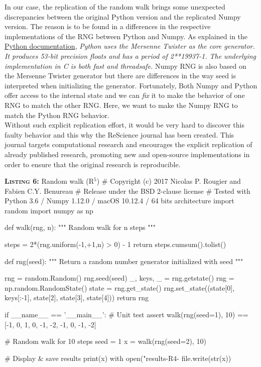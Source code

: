 \documentclass[a4paper,11pt]{article}
\begin{document}
In our case, the replication of the random walk brings some unexpected discrepancies between the original Python version and the replicated Numpy version.
The reason is to be found in a differences in the respective implementations of the RNG between Python and Numpy.
As explained in the \href{https://docs.python.org/3.6/library/random.html}{Python documentation}, {\em Python uses the Mersenne Twister as the core generator. It produces 53-bit precision floats
and has a period of 2**19937-1.
The underlying implementation in C is both fast and threadsafe.}
Numpy RNG is also based on the Mersenne Twister generator but there are differences in the way seed is interpreted when initializing the generator.
Fortunately, Both Numpy and Python offer access to the internal state and we can {\em fix} it to make the behavior of one RNG to match the other RNG.
Here, we want to make the Numpy RNG to match the Python RNG behavior.\\

Without such explicit replication effort, it would be very hard to discover this faulty behavior and this why the ReScience journal has been created.
This journal targets computational research and encourages the explicit replication of already published research, promoting new and open-source implementations in order to ensure that the original research is reproducible.

\begin{code}{\textbf{\textsc{Listing 6:}} Random walk (R$^5$)}
# Copyright (c) 2017 Nicolas P. Rougier and Fabien C.Y. Benureau
# Release under the BSD 2-clause license
# Tested with Python 3.6 / Numpy 1.12.0 / macOS 10.12.4 / 64 bits architecture
import random
import numpy as np

def walk(rng, n):
    """ Random walk for n steps """

    steps = 2*(rng.uniform(-1,+1,n) > 0) - 1
    return steps.cumsum().tolist()

def rng(seed):
    """ Return a random number generator initialized with seed """ 
    
    rng = random.Random()
    rng.seed(seed)
    _, keys, _ = rng.getstate()
    rng = np.random.RandomState()
    state = rng.get_state()
    rng.set_state((state[0], keys[:-1], state[2], state[3], state[4]))
    return rng

if __name__ == '__main__':
    # Unit test
    assert walk(rng(seed=1), 10) == [-1, 0, 1, 0, -1, -2, -1, 0, -1, -2]

    # Random walk for 10 steps
    seed = 1
    x = walk(rng(seed=2), 10)

    # Display & save results
    print(x)
    with open("results-R4-%
        file.write(str(x))
\end{code}
\end{document}
